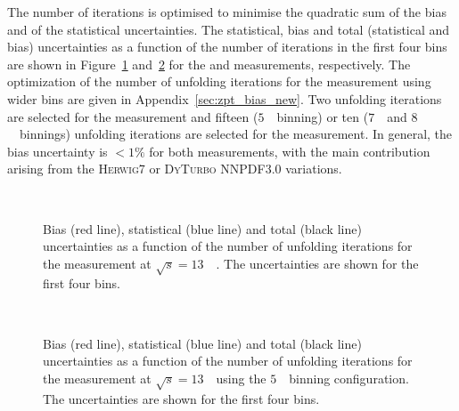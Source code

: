 The number of iterations is optimised to minimise the quadratic sum of the bias and of the statistical uncertainties.
The statistical, bias and total (statistical and bias) uncertainties as a function of the number of iterations in the first four bins are shown in Figure~\ref{fig:biasunc_min_ptll_13} and~\ref{fig:biasunc_min_uT5GeV_13} for the \ptdilep and \ut measurements, respectively.
The optimization of the number of unfolding iterations for the \ut measurement using wider bins are given in Appendix~\ref{sec:zpt_bias_new}.
Two unfolding iterations are selected for the \ptdilep measurement and fifteen ($5$~\GeV\ binning) or ten ($7$~\GeV\ and $8$~\GeV\ binnings) unfolding iterations are selected for the \ut measurement.
In general, the bias uncertainty is $<1\%$ for both measurements, with the main contribution arising from the \textsc{Herwig7} or \textsc{DyTurbo NNPDF3.0} variations.


\begin{figure}[h]
\centering
{}
\\
\caption{Bias (red line), statistical (blue line) and total (black line) uncertainties as a function of the number of unfolding iterations for the \ptdilep measurement at $\sqrt{s} = 13$~\TeV\ . The uncertainties are shown for the first four bins.}
\label{fig:biasunc_min_ptll_13}
\end{figure}

\begin{figure}[h]
\centering
{}
\\
\caption{Bias (red line), statistical (blue line) and total (black line) uncertainties as a function of the number of unfolding iterations for the \ut measurement at $\sqrt{s} = 13$~\TeV\ using the $5$~\GeV\ binning configuration. The uncertainties are shown for the first four bins.}
\label{fig:biasunc_min_uT5GeV_13}
\end{figure}

